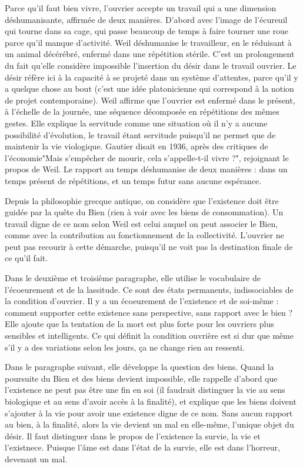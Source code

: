 \documentclass[a4paper,12pt]{book}
\begin{document}
\par Parce qu'il faut bien vivre, l'ouvrier accepte un travail qui a une dimension déshumanisante, affirmée de deux manières. D'abord avec l'image de l'écureuil qui tourne dans sa cage, qui passe beaucoup de temps à faire tourner une roue parce qu'il manque d'activité. Weil déshumanise le travailleur, en le réduisant à un animal décérébré, enfermé dans une répétition stérile. C'est un prolongement du fait qu'elle considère impossible l'insertion du désir dans le travail ouvrier. Le désir réfère ici à la capacité à se projeté dans un système d'attentes, parce qu'il y a quelque chose au bout (c'est une idée platonicienne qui correspond à la notion de projet contemporaine). Weil affirme que l'ouvrier est enfermé dans le présent, à l'échelle de la journée, une séquence décomposée en répétitions des mêmes gestes. Elle explique la servitude comme une situation où il n'y a aucune possibilité d'évolution, le travail étant servitude puisqu'il ne permet que de maintenir la vie viologique. Gautier disait en 1936, après des critiques de l'économie"Mais s'empêcher de mourir, cela s'appelle-t-il vivre ?", rejoignant le propos de Weil. Le rapport au temps déshumanise de deux manières : dans un temps présent de répétitions, et un temps futur sans aucune espérance. 
\par Depuis la philosophie grecque antique, on considère que l'existence doit être guidée par la quête du Bien (rien à voir avec les biens de consommation). Un travail digne de ce nom selon Weil est celui auquel on peut associer le Bien, comme avec la contribution au fonctionnement de la collectivité. L'ouvrier ne peut pas recourir à cette démarche, puisqu'il ne voit pas la destination finale de ce qu'il fait.
\par Dans le deuxième et troisième paragraphe, elle utilise le vocabulaire de l'écoeurement et de la lassitude. Ce sont des états permanents, indissociables de la condition d'ouvrier. Il y a un écoeurement de l'existence et de soi-même : comment supporter cette existence sans perspective, sans rapport avec le bien ? Elle ajoute que la tentation de la mort est plus forte pour les ouvriers plus sensibles et intelligents. Ce qui définit la condition ouvrière est si dur que même s'il y a des variations selon les jours, ça ne change rien au ressenti.
\par Dans le paragraphe suivant, elle développe la question des biens. Quand la poursuite du Bien et des biens devient impossible, elle rappelle d'abord que l'existence ne peut pas être une fin en soi (il faudrait distinguer la vie au sens biologique et au sens d'avoir accès à la finalité), et explique que les biens doivent s'ajouter à la vie pour avoir une existence digne de ce nom. Sans aucun rapport au bien, à la finalité, alors la vie devient un mal en elle-même, l'unique objet du désir. Il faut distinguer dans le propos de l'existence la survie, la vie et l'existnece. Puisque l'âme est dans l'état de la survie, elle est dans l'horreur, devenant un mal.
\end{document}
